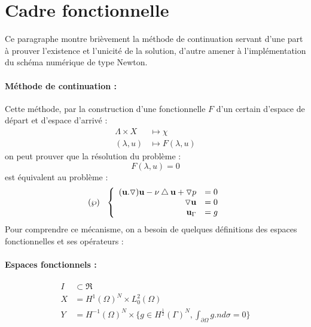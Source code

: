 \documentclass{book}
\begin{document}
\section{Cadre fonctionnelle}
Ce paragraphe montre brièvement la méthode de continuation servant d'une part à prouver l'existence et l'unicité de la solution, d'autre amener à l'implémentation du schéma numérique de type Newton. 
\paragraph{Méthode de continuation :} Cette méthode, par la construction d'une fonctionnelle $F$ d'un certain d'espace de départ et d'espace d'arrivé :
\[
\begin{array}{rl}
 \Lambda \times X &\longmapsto \chi \\
 (\lambda,u) &\longmapsto F(\lambda,u)
\end{array}
\]
on peut prouver que la résolution du problème : 
\begin{equation}\label{Pcontinuation}
 F(\lambda,u)=0
\end{equation}
est équivalent au problème : 
\begin{equation}\label{Pnavierstokes}
(\wp)\hspace{0.25cm}\left\{
\begin{array}{rl}
(\textbf{u}.\triangledown) \textbf{u} -\nu \bigtriangleup \textbf{u} + \triangledown p & =0 \\
\triangledown \textbf{u} & =0 \\
\textbf{u}_\Gamma &=g 
\end{array}\right.
\end{equation}
Pour comprendre ce mécanisme, on a besoin de quelques définitions des espaces fonctionnelles et ses opérateurs :
\paragraph{Espaces fonctionnels :}
\[
\begin{array}{rl}
  I & \subset \Re \\
  X & =H^1(\Omega)^N \times L^2_0(\Omega)\\
  Y & =H^{-1}(\Omega)^N \times \{ g \in H^{\frac{1}{2}}(\Gamma)^N, \int_{\partial\Omega}g.nd\sigma=0 \}
\end{array}
\]
\end{document}
